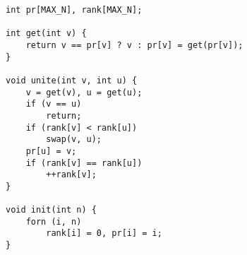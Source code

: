 \begin{verbatim}
int pr[MAX_N], rank[MAX_N]; 	

int get(int v) {
	return v == pr[v] ? v : pr[v] = get(pr[v]);
}

void unite(int v, int u) {
	v = get(v), u = get(u);
	if (v == u)
		return;
	if (rank[v] < rank[u])
		swap(v, u);
	pr[u] = v;
	if (rank[v] == rank[u])
		++rank[v];
}

void init(int n) {
	forn (i, n)
		rank[i] = 0, pr[i] = i;
}
\end{verbatim}
